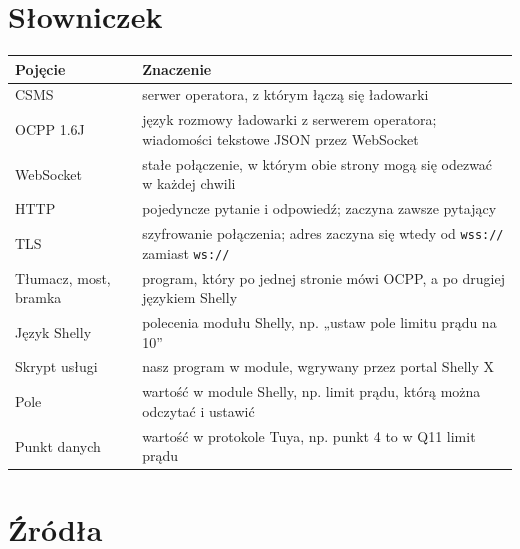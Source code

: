 \documentclass[11pt,a4paper]{article}
\begin{document}
\section*{Słowniczek}

\begin{longtable}{>{\raggedright\arraybackslash}p{2.04cm}>{\raggedright\arraybackslash}p{13.68cm}}
\toprule
\rowcolor{apteallight}\textbf{Pojęcie} & \textbf{Znaczenie} \\
\midrule\endhead
\bottomrule\endfoot
CSMS & serwer operatora, z którym łączą się ładowarki \\
OCPP 1.6J & język rozmowy ładowarki z serwerem operatora; wiadomości tekstowe JSON przez WebSocket \\
WebSocket & stałe połączenie, w którym obie strony mogą się odezwać w każdej chwili \\
HTTP & pojedyncze pytanie i odpowiedź; zaczyna zawsze pytający \\
TLS & szyfrowanie połączenia; adres zaczyna się wtedy od \texttt{wss://} zamiast \texttt{ws://} \\
Tłumacz, most, bramka & program, który po jednej stronie mówi OCPP, a po drugiej językiem Shelly \\
Język Shelly & polecenia modułu Shelly, np. „ustaw pole limitu prądu na 10” \\
Skrypt usługi & nasz program w module, wgrywany przez portal Shelly X \\
Pole & wartość w module Shelly, np. limit prądu, którą można odczytać i ustawić \\
Punkt danych & wartość w protokole Tuya, np. punkt 4 to w Q11 limit prądu \\
\end{longtable}

\section*{Źródła}
\end{document}
